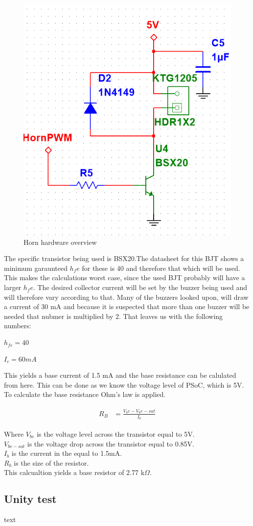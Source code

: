 \begin{figure}[H]
	\centering
	\includegraphics[width=0.7\linewidth]{Hardware/Pictures/Horn_hw}
	\caption{Horn hardware overview}
	\label{fig:Horn control}
\end{figure}

The specific transistor being used is BSX20.The datasheet  for this BJT shows a minimum garaunteed $h_fe$ for these is 40 and therefore that which will be used. This makes the calculations worst case, since the used BJT probably will have a larger $h_fe$. The desired collector current will be set by the buzzer being used and will therefore vary according to that. Many of the buzzers looked upon, will draw a current of 30 mA and because it is suspected that more than one buzzer will be needed that nubmer is multiplied by 2. That leaves us with the following numbers:

$h_{fe} = 40 $ 

$I_c = 60 mA$

This yields a base current of 1.5 mA and the base resistance can be calulated from here. This can be done as we know the voltage level of PSoC, which is 5V. \\
To calculate the base resistance Ohm's law is applied. 

\begin{align}
	\begin{split}
		R_B &= \frac{V_be - V_be-sat}{I_b}
	\end{split}
\end{align}

Where $V_{be}$ is the voltage level across the transistor equal to 5V. \\ 
$V_{be-sat}$ is the voltage drop across the transistor equal to 0.85V. \\ 
$I_b$ is the current in the equal to 1.5mA.  \\
$R_b$ is the size of the resistor. \\ 

This calcualtion yields a base resistor of 2.77 k$\Omega$.

\subsection{Unity test}
text